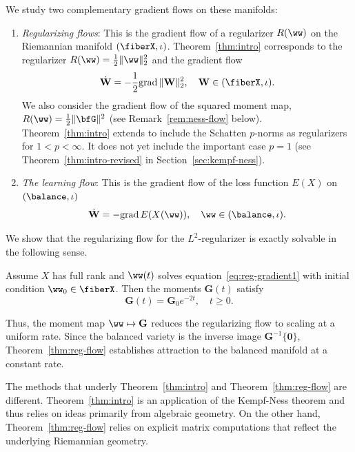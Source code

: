 We study two complementary gradient flows on these manifolds:
\begin{enumerate}  
\item {\em Regularizing flows}: This is the gradient flow of a regularizer $R(\ww)$ on the Riemannian manifold $(\fiberX,\iota)$. Theorem~\ref{thm:intro} corresponds to the regularizer $R(\ww)= \tfrac{1}{2}\|\ww\|_2^2$ and the gradient flow
\begin{equation}
\label{eq:reg-gradient1}
    \dot{\mathbf{W}}= -\frac{1}{2}\mathrm{grad}\,\|\mathbf{W}\|_2^2, \quad \mathbf{W}\in (\fiberX,\iota).
\end{equation}
We also consider the gradient flow of the squared moment map, $R(\ww)= \tfrac{1}{2}\|\bfG\|^2$ (see Remark~\ref{rem:ness-flow} below). Theorem~\ref{thm:intro} extends to include the Schatten $p$-norms as regularizers for $1<p<\infty$. It does not yet include the important case $p=1$ (see Theorem~\ref{thm:intro-revised} in Section~\ref{sec:kempf-ness}). 
\item {\em The learning flow}: This is the gradient flow of the loss function $E(X)$ on $(\balance,\iota)$
\begin{equation}
\label{eq:learn-gradient1}
    \dot{\mathbf{W}}= -\mathrm{grad} \,E(X(\ww)), \quad \ww\in (\balance,\iota).
\end{equation}
\end{enumerate}
We show that the regularizing flow for the $L^2$-regularizer is exactly solvable in the following sense. 
\begin{theorem}
\label{thm:reg-flow} Assume $X$ has full rank and $\ww(t)$ solves equation~\eqref{eq:reg-gradient1} with initial condition $\ww_0 \in \fiberX$. Then the moments $\mathbf{G}(t)$ satisfy
\begin{equation}
    \label{eq:reg-gradient2}
    \mathbf{G}(t) = \mathbf{G}_0 e^{-2t}, \quad t \geq 0.
\end{equation}
\end{theorem}
Thus, the moment map $\ww \mapsto \mathbf{G}$ reduces the regularizing flow to scaling at a uniform rate. Since the balanced variety is the inverse image $\mathbf{G}^{-1}\{\mathbf{0}\}$, Theorem~\ref{thm:reg-flow} establishes attraction to the balanced manifold at a constant rate. 
\begin{remark}
\label{rem:ind-proof}
The methods that underly Theorem~\ref{thm:intro} and Theorem~\ref{thm:reg-flow} are different. Theorem~\ref{thm:intro} is an application of the Kempf-Ness theorem and thus relies on ideas primarily from algebraic geometry. On the other hand, Theorem~\ref{thm:reg-flow} relies on explicit matrix computations that reflect the underlying Riemannian geometry. 
\end{remark}
